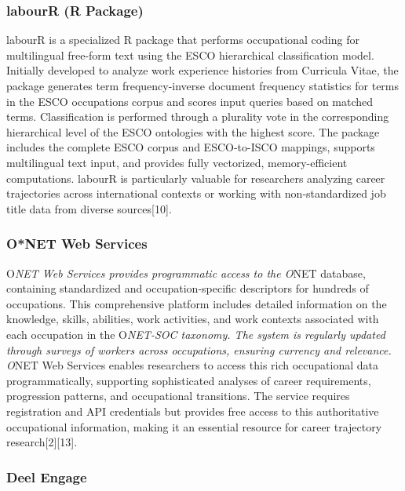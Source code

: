 \documentclass[
  letterpaper,
  DIV=11,
  numbers=noendperiod]{scrartcl}
\begin{document}
\subsubsection{labourR (R Package)}\label{labourr-r-package}

labourR is a specialized R package that performs occupational coding for
multilingual free-form text using the ESCO hierarchical classification
model. Initially developed to analyze work experience histories from
Curricula Vitae, the package generates term frequency-inverse document
frequency statistics for terms in the ESCO occupations corpus and scores
input queries based on matched terms. Classification is performed
through a plurality vote in the corresponding hierarchical level of the
ESCO ontologies with the highest score. The package includes the
complete ESCO corpus and ESCO-to-ISCO mappings, supports multilingual
text input, and provides fully vectorized, memory-efficient
computations. labourR is particularly valuable for researchers analyzing
career trajectories across international contexts or working with
non-standardized job title data from diverse sources{[}10{]}.

\subsubsection{O*NET Web Services}\label{onet-web-services}

O\emph{NET Web Services provides programmatic access to the O}NET
database, containing standardized and occupation-specific descriptors
for hundreds of occupations. This comprehensive platform includes
detailed information on the knowledge, skills, abilities, work
activities, and work contexts associated with each occupation in the
O\emph{NET-SOC taxonomy. The system is regularly updated through surveys
of workers across occupations, ensuring currency and relevance. O}NET
Web Services enables researchers to access this rich occupational data
programmatically, supporting sophisticated analyses of career
requirements, progression patterns, and occupational transitions. The
service requires registration and API credentials but provides free
access to this authoritative occupational information, making it an
essential resource for career trajectory research{[}2{]}{[}13{]}.

\subsubsection{Deel Engage}\label{deel-engage}
\end{document}

